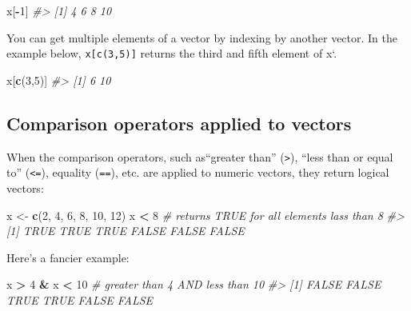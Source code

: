 \documentclass[]{book}
\newenvironment{Shaded}{\begin{snugshade}}{\end{snugshade}}
\newcommand{\CommentTok}[1]{\textcolor[rgb]{0.56,0.35,0.01}{\textit{#1}}}
\newcommand{\DecValTok}[1]{\textcolor[rgb]{0.00,0.00,0.81}{#1}}
\newcommand{\KeywordTok}[1]{\textcolor[rgb]{0.13,0.29,0.53}{\textbf{#1}}}
\newcommand{\NormalTok}[1]{#1}
\newcommand{\OperatorTok}[1]{\textcolor[rgb]{0.81,0.36,0.00}{\textbf{#1}}}
\newcommand{\StringTok}[1]{\textcolor[rgb]{0.31,0.60,0.02}{#1}}
\theoremstyle{definition}
\theoremstyle{definition}
\theoremstyle{definition}
\theoremstyle{remark}
\begin{document}
\begin{Shaded}
\begin{Highlighting}[]
\NormalTok{x[}\OperatorTok{-}\DecValTok{1}\NormalTok{]}
\CommentTok{#> [1]  4  6  8 10}
\end{Highlighting}
\end{Shaded}

You can get multiple elements of a vector by indexing by another vector.
In the example below, \texttt{x{[}c(3,5){]}} returns the third and fifth
element of x`.

\begin{Shaded}
\begin{Highlighting}[]
\NormalTok{x[}\KeywordTok{c}\NormalTok{(}\DecValTok{3}\NormalTok{,}\DecValTok{5}\NormalTok{)]}
\CommentTok{#> [1]  6 10}
\end{Highlighting}
\end{Shaded}

\hypertarget{comparison-operators-applied-to-vectors}{%
\subsection{Comparison operators applied to
vectors}\label{comparison-operators-applied-to-vectors}}

When the comparison operators, such as``greater than''
(\texttt{\textgreater{}}), ``less than or equal to''
(\texttt{\textless{}=}), equality (\texttt{==}), etc. are applied to
numeric vectors, they return logical vectors:

\begin{Shaded}
\begin{Highlighting}[]
\NormalTok{x <-}\StringTok{ }\KeywordTok{c}\NormalTok{(}\DecValTok{2}\NormalTok{, }\DecValTok{4}\NormalTok{, }\DecValTok{6}\NormalTok{, }\DecValTok{8}\NormalTok{, }\DecValTok{10}\NormalTok{, }\DecValTok{12}\NormalTok{)}
\NormalTok{x }\OperatorTok{<}\StringTok{ }\DecValTok{8}  \CommentTok{# returns TRUE for all elements lass than 8}
\CommentTok{#> [1]  TRUE  TRUE  TRUE FALSE FALSE FALSE}
\end{Highlighting}
\end{Shaded}

Here's a fancier example:

\begin{Shaded}
\begin{Highlighting}[]
\NormalTok{x }\OperatorTok{>}\StringTok{ }\DecValTok{4} \OperatorTok{&}\StringTok{ }\NormalTok{x }\OperatorTok{<}\StringTok{ }\DecValTok{10}  \CommentTok{# greater than 4 AND less than 10}
\CommentTok{#> [1] FALSE FALSE  TRUE  TRUE FALSE FALSE}
\end{Highlighting}
\end{Shaded}
\end{document}
